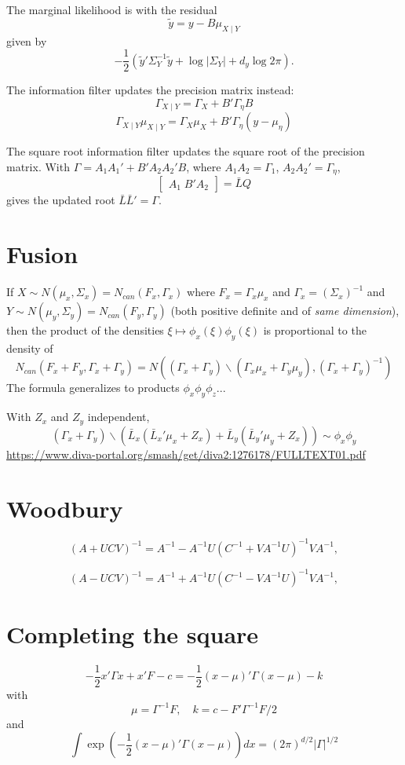 \documentclass[11pt]{article}
\begin{document}
The marginal likelihood is with the residual
\[
\tilde y = y - B \mu_{X\mid Y}
\]
given by
\[
-\frac12\left(\tilde y' \Sigma^{-1}_Y \tilde y + \log| \Sigma_Y| + d_y \log 2\pi \right).
\]

The information filter updates the precision matrix instead:
\[
\Gamma_{X \mid Y} = \Gamma_X + B'\Gamma_\eta B
\]
\[
\Gamma_{X \mid Y}\mu_{X \mid Y} = \Gamma_X \mu_X + B'\Gamma_\eta ( y - \mu_\eta) 
\]

The square root information filter updates the square root of the precision matrix. With  $\Gamma = A_1A_1' + B'A_2 A_2' B$, where $A_1A_2 = \Gamma_1$, $A_2A_2' = \Gamma_\eta$,
\[
\begin{bmatrix} A_1 \; B'A_2\end{bmatrix} = \bar L Q
\]
gives the updated root $\bar L\bar L' = \Gamma $.



\section{Fusion}

If $X \sim N(\mu_x, \Sigma_x) = N_{can}(F_x, \Gamma_x)$ where $F_x = \Gamma_x \mu_x$ and $\Gamma_x = (\Sigma_x)^{-1}$  and $Y \sim N(\mu_y, \Sigma_y) = N_{can}(F_y, \Gamma_y)$ (both positive definite and of \emph{same dimension}), then the product of the densities $\xi \mapsto \phi_x(\xi)\phi_y(\xi)$ is proportional to the density of
\[
N_{can}(F_x + F_y, \Gamma_x + \Gamma_y) = N((\Gamma_x + \Gamma_y)\backslash(\Gamma_x\mu_x + \Gamma_y\mu_y), (\Gamma_x + \Gamma_y)^{-1})\]
The formula generalizes to products $\phi_x\phi_y\phi_z$...

With $Z_x$ and $Z_y$ independent,
\[
(\Gamma_x + \Gamma_y)\backslash(\bar L_x (\bar L_x'\mu_x + Z_x) + \bar L_y (\bar L_y'\mu_y + Z_x)) 
 \sim \phi_x\phi_y
\]
\url{https://www.diva-portal.org/smash/get/diva2:1276178/FULLTEXT01.pdf}
\appendix

\section{Woodbury}

\[
\left(A+UCV\right)^{{-1}}=A^{{-1}}-A^{{-1}}U\left(C^{{-1}}+VA^{{-1}}U\right)^{{-1}}VA^{{-1}},
\]

\[
\left(A-UCV\right)^{{-1}}=A^{{-1}}+A^{{-1}}U\left(C^{{-1}}-VA^{{-1}}U\right)^{{-1}}VA^{{-1}},
\]



\section{Completing the square}
\[
-\frac12 x'\Gamma x + x' F - c = -\frac12 (x-\mu)' \Gamma (x-\mu) - k
\]
with
\[
\mu=  \Gamma^{-1} F, \quad k = c - F' \Gamma^{-1} F/2
\]
and
\[
\int \exp\left(-\frac12 (x-\mu)' \Gamma (x-\mu)\right) d x = (2\pi)^{d/2} |\Gamma|^{1/2} 
\]
\end{document}
